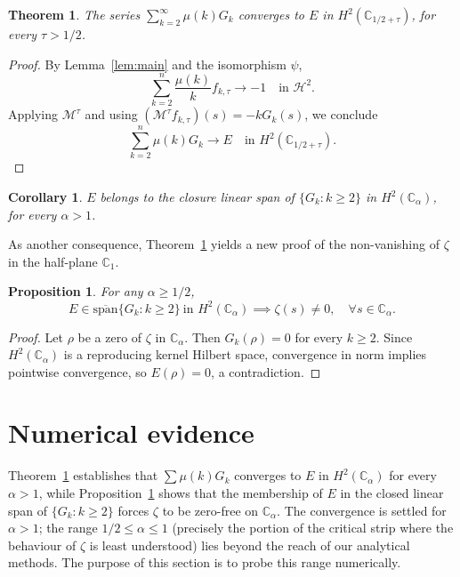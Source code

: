 \documentclass[11pt]{extarticle}
\numberwithin{equation}{section}
\theoremstyle{plain}
\newtheorem{theorem}{Theorem}[section]
\newtheorem{corollary}{Corollary}[section]
\newtheorem{proposition}{Proposition}[section]
\theoremstyle{definition}
\begin{document}
\begin{theorem}\label{main-teo}
The series $\sum_{k=2}^{\infty} \mu(k) G_k$ converges to $E$ in 
$H^2(\mathbb{C}_{1/2+\tau})$, for every $\tau > 1/2$.
\end{theorem}

\begin{proof}
By Lemma~\ref{lem:main} and the isomorphism $\psi$,
\[
\sum_{k=2}^{n} \frac{\mu(k)}{k} f_{k,\tau} \longrightarrow -1 \quad \text{in } \mathcal{H}^2.
\]
Applying $\mathcal{M}^\tau$ and using $(\mathcal{M}^\tau f_{k,\tau})(s) = -kG_k(s)$, we conclude
\[
\sum_{k=2}^{n} \mu(k) G_k \longrightarrow E \quad \text{in } H^2(\mathbb{C}_{1/2+\tau}). \tag{3.3}
\]
\end{proof}

\begin{corollary}\label{cor:main}
$E$ belongs to the closure linear span of $\{G_k : k \geq 2\}$ in 
$H^2(\mathbb{C}_\alpha)$, for every $\alpha > 1$.
\end{corollary}

As another consequence, Theorem~\ref{main-teo} yields a new proof of the 
non-vanishing of $\zeta$ in the half-plane $\mathbb{C}_1$.

\begin{proposition}\label{main-prop}
For any $\alpha \geq 1/2$,
\[
E \in \overline{\mathrm{span}}\{G_k : k \geq 2\} \ \text{in } H^2(\mathbb{C}_\alpha) 
\implies \zeta(s) \neq 0, \quad \forall s \in \mathbb{C}_\alpha.
\]
\end{proposition}

\begin{proof}
Let $\rho$ be a zero of $\zeta$ in $\mathbb{C}_\alpha$. Then $G_k(\rho) = 0$ 
for every $k \geq 2$. Since $H^2(\mathbb{C}_\alpha)$ is a reproducing kernel 
Hilbert space, convergence in norm implies pointwise convergence, so 
$E(\rho) = 0$, a contradiction.
\end{proof}

\section{Numerical evidence}

Theorem~\ref{main-teo} establishes that $\sum \mu(k)G_k$ converges to $E$ in
$H^2(\mathbb{C}_\alpha)$ for every $\alpha > 1$, while Proposition~\ref{main-prop}
shows that the membership of $E$ in the closed linear span of $\{G_k : k \geq 2\}$
forces $\zeta$ to be zero-free on $\mathbb{C}_\alpha$. The convergence is settled for $\alpha > 1$; the range
$1/2 \leq \alpha \leq 1$ (precisely the portion of the critical strip where
the behaviour of $\zeta$ is least understood) lies beyond the reach of our
analytical methods. The purpose of this section is to probe this range numerically.
\end{document}
